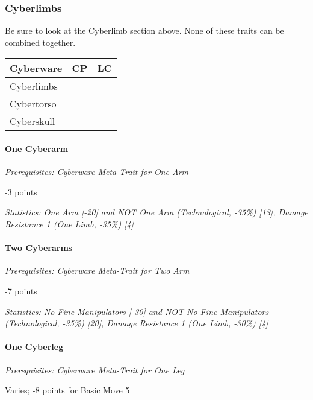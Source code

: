 \begin{multicols*}{3}
	\subsubsection{Cyberlimbs}
	
	Be sure to look at the Cyberlimb section above. None of these traits can be combined together.
	
	\begin{center}
		\begin{tabularx}{0.32\textwidth}{|X|c|c|}
			\hline
			Cyberware & CP & LC\\
			\hline
			\hline
			Cyberlimbs & & \\
			Cybertorso & & \\
			Cyberskull & & \\
			\hline
		\end{tabularx}
	\end{center}
	
	\paragraph{One Cyberarm}
	\textit{Prerequisites:  Cyberware Meta-Trait for One Arm}
	\begin{flushright}
		-3 points
	\end{flushright}
	
	
	
	\textit{\textcolor{OliveGreen}{Statistics: One Arm [-20] and NOT One Arm (Technological, -35\%) [13], Damage Resistance 1 (One Limb, -35\%) [4]}}
	
	\paragraph{Two Cyberarms}
	\textit{Prerequisites:  Cyberware Meta-Trait for Two Arm}
	\begin{flushright}
		-7 points
	\end{flushright}
	
	
	\textit{\textcolor{OliveGreen}{Statistics:  No Fine Manipulators [-30] and NOT No Fine Manipulators (Technological, -35\%) [20], Damage Resistance 1 (One Limb, -30\%) [4]}}
			
	\paragraph{One Cyberleg}
	\textit{Prerequisites:  Cyberware Meta-Trait for One Leg}
	\begin{flushright}
		Varies; -8 points for Basic Move 5
	\end{flushright}
	

\end{multicols*}
